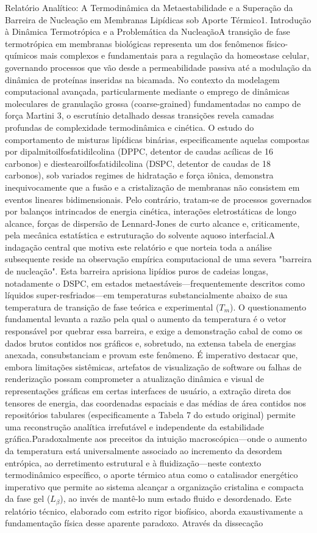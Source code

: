 Relatório Analítico: A Termodinâmica da Metaestabilidade e a Superação da Barreira de Nucleação em Membranas Lipídicas sob Aporte Térmico1. Introdução à Dinâmica Termotrópica e a Problemática da NucleaçãoA transição de fase termotrópica em membranas biológicas representa um dos fenômenos físico-químicos mais complexos e fundamentais para a regulação da homeostase celular, governando processos que vão desde a permeabilidade passiva até a modulação da dinâmica de proteínas inseridas na bicamada. No contexto da modelagem computacional avançada, particularmente mediante o emprego de dinâmicas moleculares de granulação grossa (coarse-grained) fundamentadas no campo de força Martini 3, o escrutínio detalhado dessas transições revela camadas profundas de complexidade termodinâmica e cinética. O estudo do comportamento de misturas lipídicas binárias, especificamente aquelas compostas por dipalmitoilfosfatidilcolina (DPPC, detentor de caudas acílicas de 16 carbonos) e diestearoilfosfatidilcolina (DSPC, detentor de caudas de 18 carbonos), sob variados regimes de hidratação e força iônica, demonstra inequivocamente que a fusão e a cristalização de membranas não consistem em eventos lineares bidimensionais. Pelo contrário, tratam-se de processos governados por balanços intrincados de energia cinética, interações eletrostáticas de longo alcance, forças de dispersão de Lennard-Jones de curto alcance e, criticamente, pela mecânica estatística e estruturação do solvente aquoso interfacial.A indagação central que motiva este relatório e que norteia toda a análise subsequente reside na observação empírica computacional de uma severa "barreira de nucleação". Esta barreira aprisiona lipídios puros de cadeias longas, notadamente o DSPC, em estados metaestáveis—frequentemente descritos como líquidos super-resfriados—em temperaturas substancialmente abaixo de sua temperatura de transição de fase teórica e experimental ($T_m$). O questionamento fundamental levanta a razão pela qual o aumento da temperatura é o vetor responsável por quebrar essa barreira, e exige a demonstração cabal de como os dados brutos contidos nos gráficos e, sobretudo, na extensa tabela de energias anexada, consubstanciam e provam este fenômeno. É imperativo destacar que, embora limitações sistêmicas, artefatos de visualização de software ou falhas de renderização possam comprometer a atualização dinâmica e visual de representações gráficas em certas interfaces de usuário, a extração direta dos tensores de energia, das coordenadas espaciais e das médias de área contidos nos repositórios tabulares (especificamente a Tabela 7 do estudo original) permite uma reconstrução analítica irrefutável e independente da estabilidade gráfica.Paradoxalmente aos preceitos da intuição macroscópica—onde o aumento da temperatura está universalmente associado ao incremento da desordem entrópica, ao derretimento estrutural e à fluidização—neste contexto termodinâmico específico, o aporte térmico atua como o catalisador energético imperativo que permite ao sistema alcançar a organização cristalina e compacta da fase gel ($L_{\beta}$), ao invés de mantê-lo num estado fluido e desordenado. Este relatório técnico, elaborado com estrito rigor biofísico, aborda exaustivamente a fundamentação física desse aparente paradoxo. Através da dissecação 